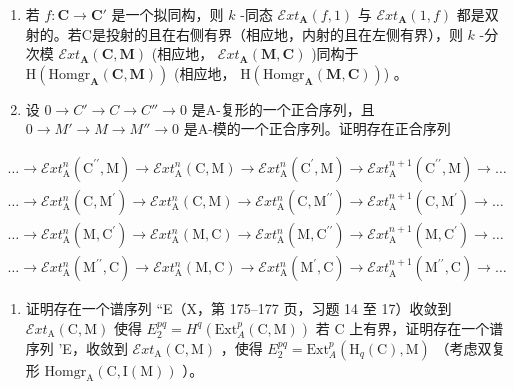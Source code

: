 \begin{enumerate}
\def\labelenumi{\alph{enumi})}
\item
  若 \(f: \mathbf{C} \to \mathbf{C}'\) 是一个拟同构，则 \(k\) -同态 \(\mathcal{E}xt_{\mathbf{A}}(f, 1)\) 与 \(\mathcal{E}xt_{\mathbf{A}}(1, f)\) 都是双射的。若C是投射的且在右侧有界（相应地，内射的且在左侧有界），则 \(k\) -分次模 \(\mathcal{E}xt_{\mathbf{A}}(\mathbf{C}, \mathbf{M})\) (相应地， \(\mathcal{E}xt_{\mathbf{A}}(\mathbf{M}, \mathbf{C})\) )同构于 \(\mathrm{H}(\mathrm{Homgr}_{\mathbf{A}}(\mathbf{C}, \mathbf{M}))\) (相应地， \(\mathrm{H}(\mathrm{Homgr}_{\mathbf{A}}(\mathbf{M}, \mathbf{C}))\)) 。
\item
  设 \(0 \to C' \to C \to C'' \to 0\) 是A-复形的一个正合序列，且 \(0 \to M' \to M \to M'' \to 0\) 是A-模的一个正合序列。证明存在正合序列
\end{enumerate}

\[
\begin{array}{l} \dots \to \mathcal {E} x t _ {\mathrm{A}} ^ {n} (\mathrm{C} ^ {\prime \prime}, \mathrm{M}) \to \mathcal {E} x t _ {\mathrm{A}} ^ {n} (\mathrm{C}, \mathrm{M}) \to \mathcal {E} x t _ {\mathrm{A}} ^ {n} (\mathrm{C} ^ {\prime}, \mathrm{M}) \to \mathcal {E} x t _ {\mathrm{A}} ^ {n + 1} (\mathrm{C} ^ {\prime \prime}, \mathrm{M}) \to \dots \\ \dots \to \mathcal {E} x t _ {\mathrm{A}} ^ {n} (\mathrm{C}, \mathrm{M} ^ {\prime}) \to \mathcal {E} x t _ {\mathrm{A}} ^ {n} (\mathrm{C}, \mathrm{M}) \to \mathcal {E} x t _ {\mathrm{A}} ^ {n} (\mathrm{C}, \mathrm{M} ^ {\prime \prime}) \to \mathcal {E} x t _ {\mathrm{A}} ^ {n + 1} (\mathrm{C}, \mathrm{M} ^ {\prime}) \to \dots \\ \dots \to \mathcal {E} x t _ {\mathrm{A}} ^ {n} (\mathrm{M}, \mathrm{C} ^ {\prime}) \to \mathcal {E} x t _ {\mathrm{A}} ^ {n} (\mathrm{M}, \mathrm{C}) \to \mathcal {E} x t _ {\mathrm{A}} ^ {n} (\mathrm{M}, \mathrm{C} ^ {\prime \prime}) \to \mathcal {E} x t _ {\mathrm{A}} ^ {n + 1} (\mathrm{M}, \mathrm{C} ^ {\prime}) \to \dots \\ \dots \to \mathcal {E} x t _ {\mathrm{A}} ^ {n} (\mathrm{M} ^ {\prime \prime}, \mathrm{C}) \to \mathcal {E} x t _ {\mathrm{A}} ^ {n} (\mathrm{M}, \mathrm{C}) \to \mathcal {E} x t _ {\mathrm{A}} ^ {n} (\mathrm{M} ^ {\prime}, \mathrm{C}) \to \mathcal {E} x t _ {\mathrm{A}} ^ {n + 1} (\mathrm{M} ^ {\prime \prime}, \mathrm{C}) \to \dots \end{array}
\]

\begin{enumerate}
\def\labelenumi{\alph{enumi})}
\setcounter{enumi}{2}
\tightlist
\item
  证明存在一个谱序列 ``E（X，第 175–177 页，习题 14 至 17）收敛到 \(\mathcal{E}xt_{\mathrm{A}}(\mathrm{C},\mathrm{M})\) 使得 \(E_2^{pq} = H^q (\mathrm{Ext}_A^p (\mathrm{C},\mathrm{M}))\) 若 C 上有界，证明存在一个谱序列 'E，收敛到 \(\mathcal{E}xt_{\mathrm{A}}(\mathrm{C},\mathrm{M})\) ，使得 \(E_2^{pq} = \mathrm{Ext}_A^p (\mathrm{H}_q(\mathrm{C}),\mathrm{M})\) （考虑双复形 \(\mathrm{Homgr}_{\mathrm{A}}(\mathrm{C},\mathrm{I}(\mathrm{M}))\) ）。
\end{enumerate}


